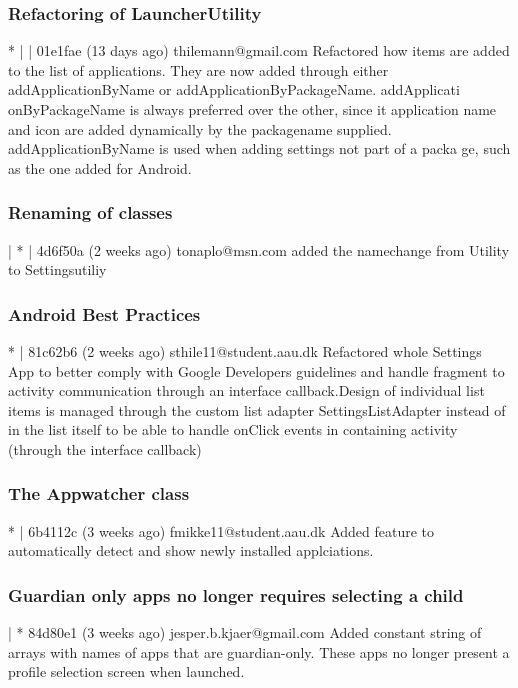 \subsubsection{Refactoring of LauncherUtility}
* | | 01e1fae (13 days ago) thilemann@gmail.com Refactored how items are added to the list of applications. They are now added through either addApplicationByName or addApplicationByPackageName. addApplicati
onByPackageName is always preferred over the other, since it application name and icon are added dynamically by the packagename supplied. addApplicationByName is used when adding settings not part of a packa
ge, such as the one added for Android.\\

\subsubsection{Renaming of classes}
| * | 4d6f50a (2 weeks ago) tonaplo@msn.com added the namechange from Utility to Settingsutiliy\\

\subsubsection{Android Best Practices}
* | 81c62b6 (2 weeks ago) sthile11@student.aau.dk Refactored whole Settings App to better comply with Google Developers guidelines and handle fragment to activity communication through an interface callback.Design of individual list items is managed through the custom list adapter SettingsListAdapter instead of in the list itself to be able to handle onClick events in containing activity (through the interface
 callback)\\
 
 \subsubsection{The Appwatcher class}
 * | 6b4112c (3 weeks ago) fmikke11@student.aau.dk Added feature to automatically detect and show newly installed applciations.
 
 \subsubsection{Guardian only apps no longer requires selecting a child}
 | * 84d80e1 (3 weeks ago) jesper.b.kjaer@gmail.com Added constant string of arrays with names of apps that are guardian-only. These apps no longer present a profile selection screen when launched.\\
